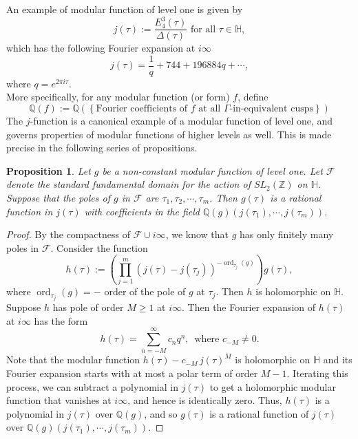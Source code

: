 \documentclass[11pt, reqno]{amsart}
\newtheorem{prop}[theorem]{Proposition}
\begin{document}
An example of modular function of level one is given by 
$$
j(\tau):=\frac{E_4^3(\tau)}{\Delta(\tau)} \text{ for all } \tau\in\mathbb{H},
$$
which has the following Fourier expansion at $i\infty$
$$
j(\tau)=\frac{1}{q}+744+196884q+\cdots,$$
where $q=e^{2\pi i\tau}$. \\


More specifically, for any modular function (or form) $f$, define 
\begin{equation*}
    \mathbb{Q}(f) := \mathbb{Q} \left( \left\{ \text{Fourier coefficients of $f$ at all $\Gamma$-in-equivalent cusps} \right\} \right)
\end{equation*}
The $j$-function is a canonical example of a modular function of level one, and governs properties of modular functions of higher levels as well. This is made precise in the following series of propositions.
\begin{prop} \label{level1}
Let $g$ be a non-constant modular function of level one. Let $\mathcal{F}$ denote the standard fundamental domain for the action of $S L_2(\mathbb{Z})$ on $\mathbb{H}$. Suppose that the poles of $g$ in $\mathcal{F}$ are $\tau_1,\tau_2,\cdots,\tau_m$. Then $g(\tau)$ is a rational function in $j(\tau)$ with coefficients in the field $\mathbb{Q}(g) \left( j(\tau_1),\cdots,j(\tau_m) \right)$.
\end{prop}
\begin{proof}
By the compactness of $\mathcal{F} \cup i\infty$, we know that $g$ has only finitely many poles in $\mathcal{F}$. Consider the function 
$$
h(\tau):=\left(\prod_{j=1}^m \left(j(\tau)-j(\tau_j)\right)^{-\operatorname{ord}_{\tau_j}(g)}\right)g(\tau),
$$
where $\operatorname{ord}_{\tau_j}(g) = - $ order of the pole of $g$ at $\tau_j$.  Then $h$ is holomorphic on $\mathbb{H}$.\\

Suppose $h$ has pole of order $M \geq 1$ at $i\infty$. Then the Fourier expansion of
$h(\tau)$ at $i\infty$ has the form
$$
h(\tau)=\sum_{n=-M}^\infty c_n q^n, \, \text{ where } c_{-M}\neq 0.
$$
Note that the modular function $h(\tau)-c_{-M}\,j(\tau)^M$ is holomorphic on $\mathbb{H}$ and its Fourier expansion starts with at most a polar term of order $M-1$. Iterating this process, we can subtract a polynomial in $j(\tau)$ to get a holomorphic modular function that vanishes at $i\infty$, and hence is identically zero. Thus, $h(\tau)$ is a polynomial in $j(\tau)$ over $\mathbb{Q}(g)$, and so $g(\tau)$ is a rational function of $j(\tau)$ over $\mathbb{Q}(g)(j(\tau_1),\cdots,j(\tau_m))$.
\end{proof}
\end{document}
